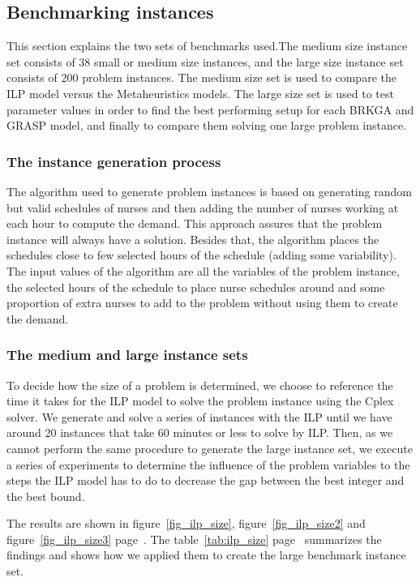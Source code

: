 \subsection{Benchmarking instances}

This section explains the two sets of benchmarks used.The medium size instance set consists of 38 small or medium size instances, and the large size instance set consists of 200 problem instances. The medium size set is used to compare the ILP model versus the Metaheuristics models. The large size set is used to test parameter values in order to find the best performing setup for each BRKGA and GRASP model, and finally to compare them solving one large problem instance.


\subsubsection{The instance generation process}

The algorithm used to generate problem instances is based on generating random but valid schedules of nurses and then adding the number of nurses working at each hour to compute the demand. This approach assures that the problem instance will always have a solution. Besides that, the algorithm places the schedules close to few selected hours of the schedule (adding some variability). The input values of the algorithm are all the variables of the problem instance, the selected hours of the schedule to place nurse schedules around and some proportion of extra nurses to add to the problem without using them to create the demand.


\subsubsection{The medium and large instance sets}


To decide how the size of a problem is determined, we choose to reference the time it takes for the ILP model to solve the problem instance using the Cplex solver. We generate and solve a series of instances with the ILP until we have around 20 instances that take 60 minutes or less to solve by ILP. Then, as we cannot perform the same procedure to generate the large instance set, we execute a series of experiments to determine the influence of the problem variables to the steps the ILP model has to do to decrease the gap between the best integer and the best bound.

The results are shown in figure~\ref{fig_ilp_size}, figure~\ref{fig_ilp_size2} and figure~\ref{fig_ilp_size3} page~\pageref{fig_ilp_size}. The table~\ref{tab:ilp_size} page~\pageref{tab:ilp_size} summarizes the findings and shows how we applied them to create the large benchmark instance set.

